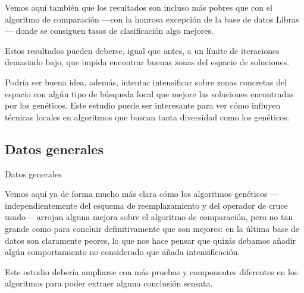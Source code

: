 \documentclass[a4paper, 11pt, titlepage]{article}
\begin{document}
    Vemos aquí también que los resultados son incluso más pobres que con el algoritmo de comparación ---con la honrosa excepción de la base de datos Libras--- donde se consiguen tasas de clasificación algo mejores.

    Estos resultados pueden deberse, igual que antes, a un límite de iteraciones demasiado bajo, que impida encontrar buenas zonas del espacio de soluciones.

    Podría ser buena idea, además, intentar intensificar sobre zonas concretas del espacio con algún tipo de búsqueda local que mejore las soluciones encontradas por los genéticos. Este estudio puede ser interesante para ver cómo influyen técnicas locales en algoritmos que buscan tanta diversidad como los genéticos.

    \subsection{Datos generales}
    \begin{table}[!htb]
        \maketablemean{\dataMedias}
        \caption{Datos generales}
        \label{medias}
    \end{table}

    Vemos aquí ya de forma mucho más clara cómo los algoritmos genéticos ---independientemente del esquema de reemplazamiento y del operador de cruce usado--- arrojan alguna mejora sobre el algoritmo de comparación, pero no tan grande como para concluir definitivamente que son mejores: en la última base de datos son claramente peores, lo que nos hace pensar que quizás debamos añadir algún comportamiento no considerado que añada intensificación.

    Este estudio debería ampliarse con más pruebas y componentes diferentes en los algoritmos para poder extraer alguna conclusión sensata.
\end{document}
